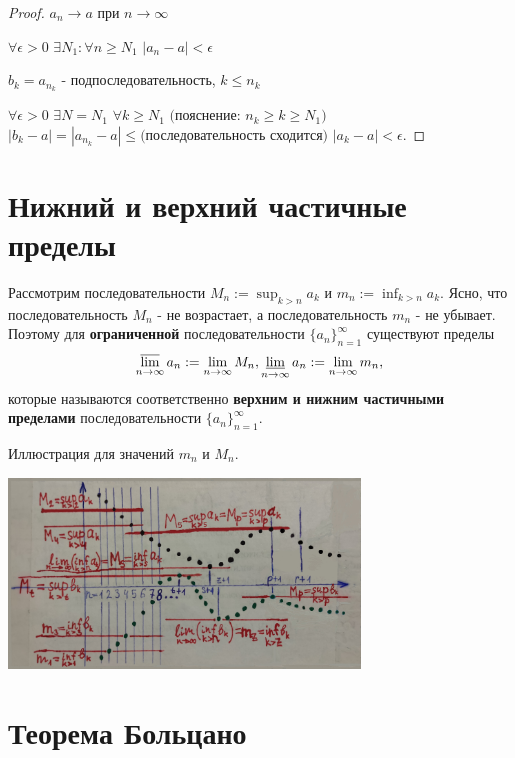 	\begin{proof}
		$a_n \to a$ при $n \to \infty$
		
		$\forall \epsilon > 0$ $\exists N_1: \forall n \geqslant N_1$ $|a_n - a| < \epsilon$
		
		$b_k = a_{n_k}$ - подпоследовательность, $k \leqslant n_k$
		
		$\forall \epsilon > 0$ $\exists N = N_1$ $\forall k \geqslant N_1 \text{ (пояснение: } n_k \geqslant k \geqslant N_1)$ $|b_k - a| = |a_{n_k} - a| \leqslant \text{(последовательность сходится) } |a_k - a| < \epsilon.$
	\end{proof}
	
	\section{Нижний и верхний частичные пределы}
	
	\begin{definition}
		Рассмотрим последовательности $M_n := \sup_{k > n} a_k$ и $m_n := \inf_{k > n} a_k$. Ясно, что последовательность $M_n$ - не возрастает, а
		последовательность $m_n$ - не убывает. Поэтому для \textbf{ограниченной} последовательности $\{a_n\}^{\infty}_{n = 1}$ существуют пределы
		\[ \operatorname*{\overline{lim}}_{n \to \infty} a_n := \lim_{n \to \infty} M_n, \operatorname*{\underline{lim}}_{n \to \infty}	a_n := \lim_{n \to \infty} m_n, \]
		которые называются соответственно \textbf{верхним и нижним частичными пределами} последовательности $\{a_n\}^{\infty}_{n = 1}$.
	\end{definition}
	
	Иллюстрация для значений $m_n$ и $M_n$.
	\begin{center}
		\includegraphics[width=0.7\textwidth]{img/lecture5/inf_and_sup_examples}
	\end{center}
	
	\section{Теорема Больцано}
	
